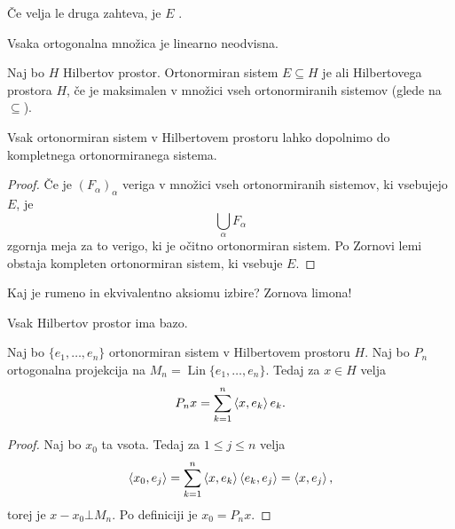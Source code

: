 \begin{opomba}
  Če velja le druga zahteva, je $E$ .
\end{opomba}

\begin{lema}
  Vsaka ortogonalna množica je linearno neodvisna.
\end{lema}

\begin{definicija}
  Naj bo $H$ Hilbertov prostor. Ortonormiran sistem $E \subseteq H$ je
   ali  Hilbertovega prostora $H$, če je maksimalen
  v množici vseh ortonormiranih sistemov (glede na $\subseteq$).
\end{definicija}

\begin{trditev}
  Vsak ortonormiran sistem v Hilbertovem prostoru lahko dopolnimo do kompletnega
  ortonormiranega sistema.
\end{trditev}

\begin{proof}
  Če je $(F_\alpha)_\alpha$ veriga v množici vseh ortonormiranih sistemov, ki
  vsebujejo $E$, je
  \[
	\bigcup_\alpha F_\alpha
  \]
  zgornja meja za to verigo, ki je očitno ortonormiran sistem.
  Po Zornovi lemi obstaja kompleten ortonormiran sistem, ki vsebuje $E$.
\end{proof}

\begin{opomba}
  Kaj je rumeno in ekvivalentno aksiomu izbire?
  Zornova limona!
\end{opomba}

\begin{posledica}
  Vsak Hilbertov prostor ima bazo.
\end{posledica}

\begin{trditev}
  Naj bo $\{e_1, \ldots, e_n\}$ ortonormiran sistem v Hilbertovem prostoru $H$.
  Naj bo $P_n$ ortogonalna projekcija na $M_n = \operatorname{Lin} \{e_1,
  \ldots, e_n\}$.
  Tedaj za $x \in H$ velja
  \[
	P_n x = \sum_{k=1}^n \left< x, e_k \right> e_k.
  \]
\end{trditev}

\begin{proof}
  Naj bo $x_0$ ta vsota.
  Tedaj za $1 \le j \le n$ velja
  \[
	\left< x_0, e_j \right> = \sum_{k=1}^n \left< x, e_k \right> \left< e_k, e_j \right> = \left< x, e_j \right>,
  \]
  torej je $x - x_0 \bot M_n$.
  Po definiciji je $x_0 = P_n x$.
\end{proof}


